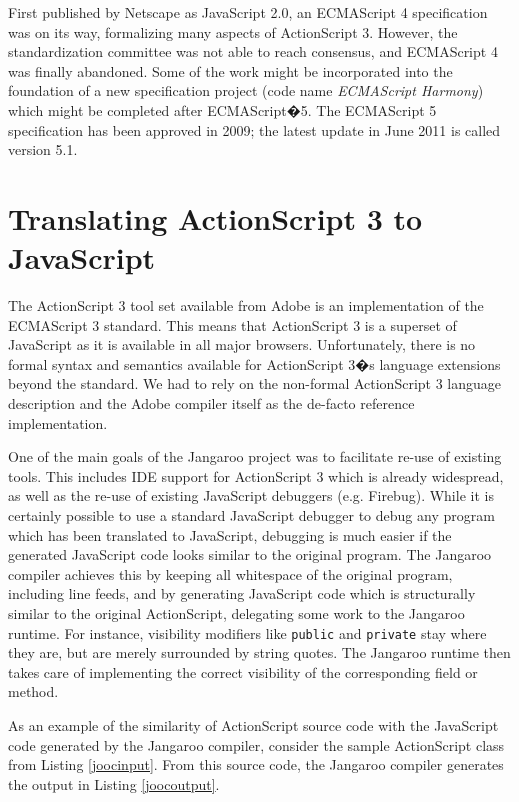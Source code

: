 \documentclass[11pt]{sigplanconf}
\begin{document}
First published by Netscape as JavaScript 2.0, an ECMAScript 4 specification\citep{ecmascript4} was on its way, formalizing many aspects of ActionScript 3. However, the standardization committee was not able to reach consensus, and ECMAScript 4 was finally abandoned. Some of the work might be incorporated into the foundation of a new specification project (code name \emph{ECMAScript Harmony}\citep{Eich2008-es-discuss}) which might be completed after ECMAScript�5.  The ECMAScript 5 spec\-i\-fi\-ca\-tion\citep{ecma262-5.1} has been approved in 2009; the latest update in June 2011 is called version 5.1.

\section{Translating ActionScript 3 to JavaScript}

The ActionScript 3 tool set available from Adobe is an implementation of the ECMAScript 3 standard\citep{ecma262-3rd}. This means that ActionScript 3 is a superset of Java\-Script as it is available in all major browsers. Unfortunately, there is no formal syntax and semantics available for ActionScript 3�s language extensions beyond the standard. We had to rely on the non-formal ActionScript 3 language description\citep{actionscript-reference} and the Adobe compiler itself\citep{mxmlc} as the de-facto reference implementation.

One of the main goals of the Jangaroo project was to facilitate re-use of existing tools. This includes IDE support for ActionScript 3 which is already widespread\citep{jwiki}, as well as the re-use of existing JavaScript debuggers (e.g. Firebug\citep{firefox-firebug-plugin}). While it is certainly possible to use a standard JavaScript debugger to debug any program which has been translated to JavaScript, debugging is much easier if the generated JavaScript code looks similar to the original program. The Jangaroo compiler achieves this by keeping all whitespace of the original program, including line feeds, and by generating JavaScript code which is structurally similar to the original ActionScript, delegating some work to the Jangaroo runtime. For instance, visibility modifiers like \texttt{public} and \texttt{private} stay where they are, but are merely surrounded by string quotes. The Jangaroo runtime then takes care of implementing the correct visibility of the corresponding field or method.

As an example of the similarity of ActionScript source code with the JavaScript code generated by the Jangaroo compiler, consider the sample ActionScript class from Listing \ref{joocinput}. From this source code, the Jangaroo compiler generates the output in Listing \ref{joocoutput}.
\end{document}
